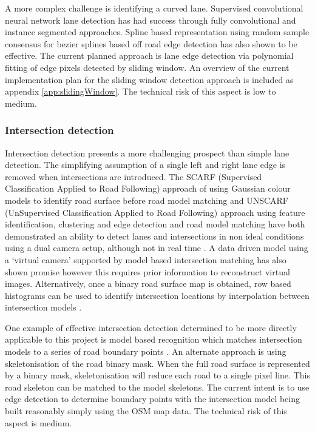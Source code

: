 \documentclass[]{aiaa-tc}%
\begin{document}
A more complex challenge is identifying a curved lane. Supervised convolutional neural network lane detection has had success through fully convolutional \citep{cnnLanes1} and instance segmented \citep{cnnLanes2} approaches. Spline based representation using random sample consensus for bezier splines based off road edge detection \citep{ransicBezierFit} has also shown to be effective. The current planned approach is lane edge detection via polynomial fitting of edge pixels detected by sliding window. An overview of the current implementation plan for the sliding window detection approach is included as appendix \ref{app:slidingWindow}. The technical risk of this aspect is low to medium.


\subsubsection{Intersection detection}

Intersection detection presents a more challenging prospect than simple lane detection. The simplifying assumption of a single left and right lane edge is removed when intersections are introduced. The SCARF (Supervised Classification Applied to Road Following) approach of using Gaussian colour models to identify road surface before road model matching \citep{scarf} and UNSCARF (UnSupervised Classification Applied to Road Following) approach using feature identification, clustering and edge detection and road model matching \citep{unscarf} have both demonstrated an ability to detect lanes and intersections in non ideal conditions using a dual camera setup, although not in real time \citep{scarfAndUnscarfPresented}. A data driven model using a `virtual camera' supported by model based intersection matching has also shown promise \citep{alvinnVC} however this requires prior information to reconstruct virtual images. Alternatively, once a binary road surface map is obtained, row based histograms can be used to identify intersection locations by interpolation between intersection models \citep{intersectionDetectionSingleCamera}.

One example of effective intersection detection determined to be more directly applicable to this project is model based recognition which matches intersection models to a series of road boundary points \citep{modelBasedIntersection}. An alternate approach is using skeletonisation of the road binary mask. When the full road surface is represented by a binary mask, skeletonisation will reduce each road to a single pixel line. This road skeleton can be matched to the model skeletons. The current intent is to use edge detection to determine boundary points with the intersection model being built reasonably simply using the OSM map data. The technical risk of this aspect is medium.
\end{document}
